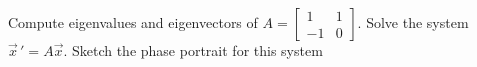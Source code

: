 \documentclass{ximera}
\begin{document}
\begin{exercise}%
    \begin{tasks}
        \task Compute eigenvalues and eigenvectors of
            $A=\left[ 
                \begin{smallmatrix}
                    1 & 1 \\
                    -1 & 0 
                \end{smallmatrix}
            \right]$.
        \task Solve the system $\vec{x}\,' = A\vec{x}$.
        \task Sketch the phase portrait for this system
    \end{tasks}
\end{exercise}
\end{document}
